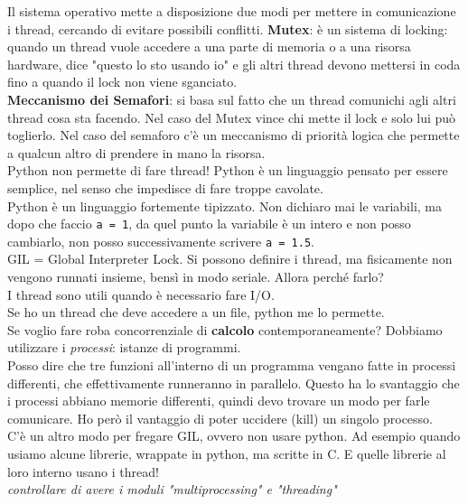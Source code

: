 Il sistema operativo mette a disposizione due modi per mettere in comunicazione i thread, cercando di evitare possibili conflitti.
\textbf{Mutex}: è un sistema di locking: quando un thread vuole accedere a una parte di memoria o a una risorsa hardware, dice "questo lo sto usando io" e gli altri thread devono mettersi in coda fino a quando il lock non viene sganciato.\\
\textbf{Meccanismo dei Semafori}: si basa sul fatto che un thread comunichi agli altri thread cosa sta facendo. Nel caso del Mutex vince chi mette il lock e solo lui può toglierlo. Nel caso del semaforo c'è un meccanismo di priorità logica che permette a qualcun altro di prendere in mano la risorsa.\\

Python non permette di fare thread! Python è un linguaggio pensato per essere semplice, nel senso che impedisce di fare troppe cavolate.\\
Python è un linguaggio fortemente tipizzato. Non dichiaro mai le variabili, ma dopo che faccio \texttt{a = 1}, da quel punto la variabile è un intero e non posso cambiarlo, non posso successivamente scrivere \texttt{a = 1.5}.\\
\noindent
GIL = Global Interpreter Lock. Si possono definire i thread, ma fisicamente non vengono runnati insieme, bensì in modo seriale.
Allora perché farlo?\\
I thread sono utili quando è necessario fare I/O.\\
Se ho un thread che deve accedere a un file, python me lo permette.\\

Se voglio fare roba concorrenziale di \textbf{calcolo} contemporaneamente? Dobbiamo utilizzare i \textit{processi}: istanze di programmi.\\

Posso dire che tre funzioni all'interno di un programma vengano fatte in processi differenti, che effettivamente runneranno in parallelo. Questo ha lo svantaggio che i processi abbiano memorie differenti, quindi devo trovare un modo per farle comunicare.
Ho però il vantaggio di poter uccidere (kill) un singolo processo.\\

C'è un altro modo per fregare GIL, ovvero non usare python. Ad esempio quando usiamo alcune librerie, wrappate in python, ma scritte in C. E quelle librerie al loro interno usano i thread!\\

\textit{controllare di avere i moduli "multiprocessing" e "threading"}

